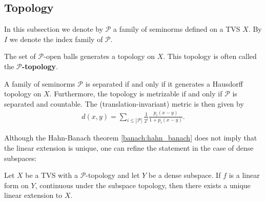 \subsection{Topology}

    In this subsection we denote by $\mathscr{P}$ a family of seminorms defined on a TVS $X$. By $I$ we denote the index family of $\mathscr{P}$.


    \begin{property}
        The set of $\mathscr{P}$-open balls generates a topology on $X$. This topology is often called the \textbf{$\mathscr{P}$-topology}.
    \end{property}
    \begin{property}\label{hilbert:separated_metric}
        A family of seminorms $\mathcal{P}$ is separated if and only if it generates a Hausdorff topology on $X$. Furthermore, the topology is metrizable if and only if $\mathcal{P}$ is separated and countable. The (translation-invariant) metric is then given by
        \begin{gather}
            d(x, y) = \sum_{i\leq|\mathcal{P}|}\frac{1}{2^i}\frac{p_i(x-y)}{1 + p_i(x-y)}.
        \end{gather}
    \end{property}

    Although the Hahn-Banach theorem \ref{banach:hahn_banach} does not imply that the linear extension is unique, one can refine the statement in the case of dense subspaces:
    \begin{result}
        Let $X$ be a TVS with a $\mathscr{P}$-topology and let $Y$ be a dense subspace. If $f$ is a linear form on $Y$, continuous under the subspace topology, then there exists a unique linear extension to $X$.
    \end{result}

